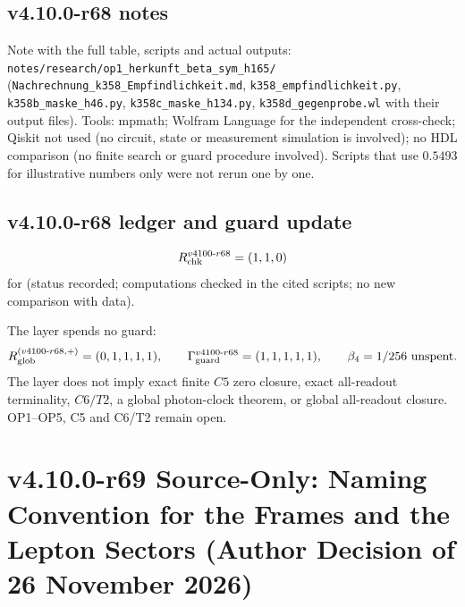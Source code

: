 \subsection*{v4.10.0-r68 notes}
\label{subsec:v4100-r68-notes}

{\raggedright
Note with the full table, scripts and actual outputs:
\texttt{notes/\allowbreak research/\allowbreak op1\_\allowbreak herkunft\_\allowbreak beta\_\allowbreak sym\_\allowbreak h165/}
(\texttt{Nachrechnung\_\allowbreak k358\_\allowbreak Empfindlichkeit.md}, \texttt{k358\_\allowbreak empfindlichkeit.py},
\texttt{k358b\_\allowbreak maske\_\allowbreak h46.py}, \texttt{k358c\_\allowbreak maske\_\allowbreak h134.py},
\texttt{k358d\_\allowbreak gegenprobe.wl} with their output files).
Tools: mpmath; Wolfram Language for the independent cross-check; Qiskit not used (no circuit, state or measurement simulation is involved);
no HDL comparison (no finite search or guard procedure involved).  Scripts that use \(0.5493\) for illustrative numbers only were not rerun
one by one.
\par}

\subsection*{v4.10.0-r68 ledger and guard update}
\label{subsec:v4100-r68-ledger-guard}

\[
R_{\rm chk}^{v4100\text{-}r68}=(1,1,0)
\]
for (status recorded; computations checked in the cited scripts; no new comparison with data).

The layer spends no guard:
\[
R_{\rm glob}^{(v4100\text{-}r68,+)}=(0,1,1,1,1),
\qquad
\Gamma_{\rm guard}^{v4100\text{-}r68}=(1,1,1,1,1),
\qquad
\beta_4=1/256\ \text{unspent}.
\]
The layer does not imply exact finite \(C5\) zero closure, exact all-readout terminality, \(C6/T2\), a global photon-clock theorem,
or global all-readout closure.  OP1--OP5, C5 and C6/T2 remain open.

\clearpage
\section*{v4.10.0-r69 Source-Only: Naming Convention for the Frames and the Lepton Sectors (Author Decision of 26 November 2026)}
\label{sec:v4100-r69-naming}

